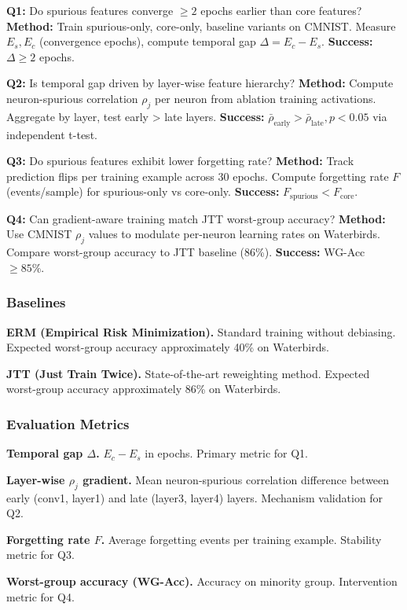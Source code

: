 \textbf{Q1:} Do spurious features converge $\geq 2$ epochs earlier than core features?  
\textbf{Method:} Train spurious-only, core-only, baseline variants on CMNIST. Measure $E_s, E_c$ (convergence epochs), compute temporal gap $\Delta = E_c - E_s$.  
\textbf{Success:} $\Delta \geq 2$ epochs.

\textbf{Q2:} Is temporal gap driven by layer-wise feature hierarchy?  
\textbf{Method:} Compute neuron-spurious correlation $\rho_j$ per neuron from ablation training activations. Aggregate by layer, test early > late layers.  
\textbf{Success:} $\bar{\rho}_{\text{early}} > \bar{\rho}_{\text{late}}, p < 0.05$ via independent t-test.

\textbf{Q3:} Do spurious features exhibit lower forgetting rate?  
\textbf{Method:} Track prediction flips per training example across 30 epochs. Compute forgetting rate $F$ (events/sample) for spurious-only vs core-only.  
\textbf{Success:} $F_{\text{spurious}} < F_{\text{core}}$.

\textbf{Q4:} Can gradient-aware training match JTT worst-group accuracy?
\textbf{Method:} Use CMNIST $\rho_j$ values to modulate per-neuron learning rates on Waterbirds. Compare worst-group accuracy to JTT baseline (86\%).
\textbf{Success:} WG-Acc $\geq 85\%$.

\subsubsection{Baselines}

\textbf{ERM (Empirical Risk Minimization).} Standard training without debiasing. Expected worst-group accuracy approximately 40\% on Waterbirds.

\textbf{JTT (Just Train Twice).} State-of-the-art reweighting method. Expected worst-group accuracy approximately 86\% on Waterbirds.

\subsubsection{Evaluation Metrics}

\textbf{Temporal gap $\Delta$.} $E_c - E_s$ in epochs. Primary metric for Q1.

\textbf{Layer-wise $\rho_j$ gradient.} Mean neuron-spurious correlation difference between early (conv1, layer1) and late (layer3, layer4) layers. Mechanism validation for Q2.

\textbf{Forgetting rate $F$.} Average forgetting events per training example. Stability metric for Q3.

\textbf{Worst-group accuracy (WG-Acc).} Accuracy on minority group. Intervention metric for Q4.

